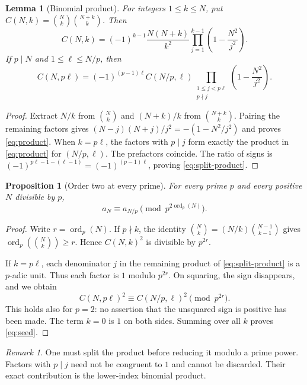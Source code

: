 \documentclass[11pt,letterpaper]{article}
\numberwithin{equation}{section}
\newtheorem{proposition}[proposition]{Proposition}
\newtheorem{lemma}[lemma]{Lemma}
\theoremstyle{definition}
\theoremstyle{remark}
\newtheorem{remark}[remark]{Remark}
\newcommand{\vp}{\operatorname{ord}_p}
\begin{document}
\begin{lemma}[Binomial product]\label{lem:product}
For integers $1\le k\le N$, put
$C(N,k)=\binom Nk\binom{N+k}k$. Then
\begin{equation}\label{eq:product}
 C(N,k)=(-1)^{k-1}\frac{N(N+k)}{k^2}
       \prod_{j=1}^{k-1}\left(1-\frac{N^2}{j^2}\right).
\end{equation}
If $p\mid N$ and $1\le\ell\le N/p$, then
\begin{equation}\label{eq:split-product}
 C(N,p\ell)=(-1)^{(p-1)\ell}C(N/p,\ell)
 \prod_{\substack{1\le j<p\ell\\p\nmid j}}
       \left(1-\frac{N^2}{j^2}\right).
\end{equation}
\end{lemma}
\begin{proof}
Extract $N/k$ from $\binom Nk$ and $(N+k)/k$ from $\binom{N+k}k$.
Pairing the remaining factors gives
$(N-j)(N+j)/j^2=-(1-N^2/j^2)$ and proves \eqref{eq:product}.
When $k=p\ell$, the factors with $p\mid j$ form exactly the product in
\eqref{eq:product} for $(N/p,\ell)$. The prefactors coincide. The ratio
of signs is $(-1)^{p\ell-1-(\ell-1)}=(-1)^{(p-1)\ell}$, proving
\eqref{eq:split-product}.
\end{proof}

\begin{proposition}[Order two at every prime]\label{prop:seed}
For every prime $p$ and every positive $N$ divisible by $p$,
\begin{equation}\label{eq:seed}
 a_N\equiv a_{N/p}\pmod{p^{2\vp(N)}}.
\end{equation}
\end{proposition}
\begin{proof}
Write $r=\vp(N)$. If $p\nmid k$, the identity
$\binom Nk=(N/k)\binom{N-1}{k-1}$ gives
$\vp(\binom Nk)\ge r$. Hence $C(N,k)^2$ is divisible by $p^{2r}$.

If $k=p\ell$, each denominator $j$ in the remaining product of
\eqref{eq:split-product} is a $p$-adic unit. Thus each factor is
$1$ modulo $p^{2r}$. On squaring, the sign disappears, and we obtain
\[
 C(N,p\ell)^2\equiv C(N/p,\ell)^2\pmod{p^{2r}}.
\]
This holds also for $p=2$: no assertion that the unsquared sign is
positive has been made. The term $k=0$ is $1$ on both sides. Summing over
all $k$ proves \eqref{eq:seed}.
\end{proof}

\begin{remark}
One must split the product before reducing it modulo a prime power.
Factors with $p\mid j$ need not be congruent to $1$ and cannot be discarded.
Their exact contribution is the lower-index binomial product.
\end{remark}
\end{document}
